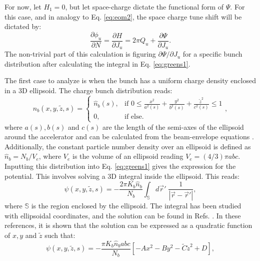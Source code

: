 For now, let $H_1=0$, but let space-charge dictate the functional form of $\Psi$. For this case, and in analogy to Eq. \ref{eq:eom2}, the space charge tune shift will be dictated by:
\begin{equation}
    \label{eq:eompsi}
    \frac{\partial \phi_u}{\partial N} = \frac{\partial H}{\partial J_u} = 2\pi Q_u + \frac{\partial \Psi}{\partial J_u}.
\end{equation}
The non-trivial part of this calculation is figuring ${\partial \Psi}/{\partial J_u}$ for a specific bunch distribution after calculating the integral in Eq. \ref{eq:greens1}.

The first case to analyze is when the bunch has a uniform charge density enclosed in a 3D ellipsoid. The charge bunch distribution reads:
\begin{equation}
    \label{eq:dist}
    n_b(x,y,\tilde{z},s) = \left\{
        \begin{array}{cc} 
            \hat{n}_b(s), & \text{if  } 0 \leq \frac{x^2}{a^2(s)} + \frac{y^2}{b^2(s)} + \frac{\tilde{z}^2}{c^2(s)} \leq 1\\
            0, & \text{if else.}
        \end{array} 
    \right.,
\end{equation}
where $a(s),b(s)$ and $c(s)$ are the length of the semi-axes of the ellipsoid around the accelerator and can be calculated from the beam-envelope equations \cite{witchcraft}. Additionally, the constant particle number density over an ellipsoid is defined as $\hat{n}_b=N_b/V_e$, where $V_e$ is the volume of an ellipsoid reading $V_e=(4/3) \pi abc$. Inputting this distribution into Eq. \ref{eq:greens1} gives the expression for the potential. This involves solving a 3D integral inside the ellipsoid. This reads:
\begin{equation}
    \label{eq:potential1}
    \psi(x,y,\tilde{z},s)=-\frac{2 \pi K_b \hat{n}_b}{N_b} \int_{\mathbb{S}} d\vec{r}' \; \frac{1}{\left| \vec{r}-\vec{r}' \right|},
\end{equation} 
where $\mathbb{S}$ is the region enclosed by the ellipsoid. The integral has been studied with ellipsoidal coordinates, and the solution can be found in Refs. \cite{Kellog_1967, witchcraft}. In these references, it is shown that the solution can be expressed as a quadratic function of $x,y$ and $\tilde{z}$ such that:
\begin{equation}
    \label{eq:potential2}
    \psi(x,y,\tilde{z},s)=-\frac{\pi K_b \hat{n}_b a b c }{N_b} \left[ -A x^2 -B y^2 - \tilde{C} \tilde{z}^2 +D \right],
\end{equation}
